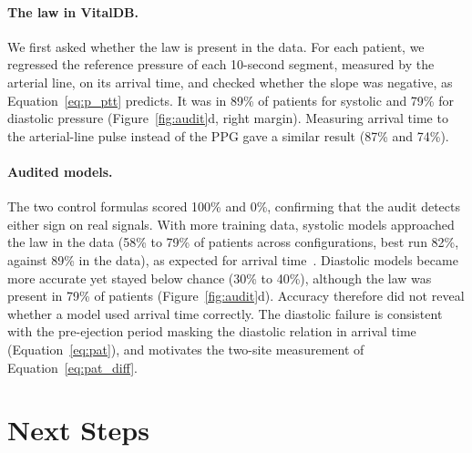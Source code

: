 \paragraph{The law in VitalDB.}
We first asked whether the law is present in the data. For each patient, we regressed the reference pressure of each 10-second segment, measured by the arterial line, on its arrival time, and checked whether the slope was negative, as Equation~\eqref{eq:p_ptt} predicts. It was in 89\% of patients for systolic and 79\% for diastolic pressure (Figure~\ref{fig:audit}d, right margin). Measuring arrival time to the arterial-line pulse instead of the PPG gave a similar result (87\% and 74\%).

\paragraph{Audited models.}
The two control formulas scored 100\% and 0\%, confirming that the audit detects either sign on real signals. With more training data, systolic models approached the law in the data (58\% to 79\% of patients across configurations, best run 82\%, against 89\% in the data), as expected for arrival time~\citep{payne2006pulse}. Diastolic models became more accurate yet stayed below chance (30\% to 40\%), although the law was present in 79\% of patients (Figure~\ref{fig:audit}d). Accuracy therefore did not reveal whether a model used arrival time correctly. The diastolic failure is consistent with the pre-ejection period masking the diastolic relation in arrival time (Equation~\eqref{eq:pat}), and motivates the two-site measurement of Equation~\eqref{eq:pat_diff}.

\section{Next Steps}
\label{sec:audit-next}

